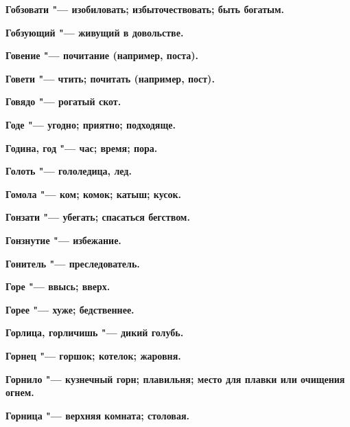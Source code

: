 \begin{multicols}{2}
\bfseries Гобзовати\normalfont{} "--- изобиловать; избыточествовать; быть богатым. 




\bfseries Гобзующий\normalfont{} "--- живущий в довольстве. 




\bfseries Говение\normalfont{} "--- почитание (например, поста). 




\bfseries Говети\normalfont{} "--- чтить; почитать (например, пост). 




\bfseries Говядо\normalfont{} "--- рогатый скот. 




\bfseries Годе\normalfont{} "--- угодно; приятно; подходяще. 




\bfseries Година, год\normalfont{} "--- час; время; пора. 




\bfseries Голоть\normalfont{} "--- гололедица, лед. 




\bfseries Гомола\normalfont{} "--- ком; комок; катыш; кусок. 




\bfseries Гонзати\normalfont{} "--- убегать; спасаться бегством. 




\bfseries Гонзнутие\normalfont{} "--- избежание. 




\bfseries Гонитель\normalfont{} "--- преследователь. 




\bfseries Горе\normalfont{} "--- ввысь; вверх. 




\bfseries Горее\normalfont{} "--- хуже; бедственнее. 




\bfseries Горлица, горличишь\normalfont{} "--- дикий голубь. 




\bfseries Горнец\normalfont{} "--- горшок; котелок; жаровня. 




\bfseries Горнило\normalfont{} "--- кузнечный горн; плавильня; место для плавки или очищения огнем. 




\bfseries Горница\normalfont{} "--- верхняя комната; столовая. 





\end{multicols}

